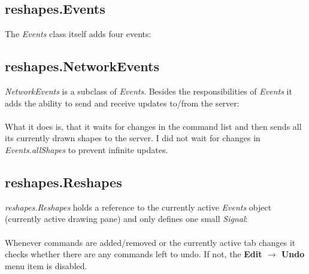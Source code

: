 \subsection{reshapes.Events}

The \textit{Events} class itself adds four events: \\

\subsection{reshapes.NetworkEvents}

\textit{NetworkEvents} is a subclass of \textit{Events}. 
Besides the responsibilities of \textit{Events} it adds the ability to send and receive updates to/from the server: \\
 \\
What it does is, that it waits for changes in the command list and then sends all its currently drawn shapes to the server. 
I did not wait for changes in \textit{Events.allShapes} to prevent infinite updates.

\subsection{reshapes.Reshapes}

\textit{reshapes.Reshapes} holds a reference to the currently active \textit{Events} object (currently active drawing pane) and only defines one small \textit{Signal}: \\
 \\
Whenever commands are added/removed or the currently active tab changes it checks whether there are any commands left to undo. 
If not, the \textbf{Edit $\rightarrow$ Undo} menu item is disabled.

